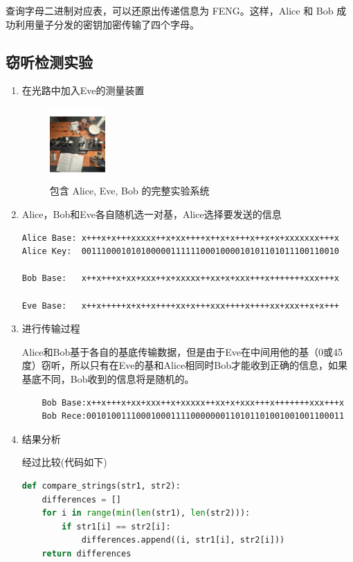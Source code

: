 \documentclass{ctexart}
\begin{document}
查询字母二进制对应表，可以还原出传递信息为 FENG。这样，Alice 和 Bob 成功利用量子分发的密钥加密传输了四个字母。

\subsection{窃听检测实验}
\begin{enumerate}
\item 在光路中加入Eve的测量装置
\begin{figure}[htbp]
    \centering
    \includegraphics[width=0.2\textwidth,height=0.3\textwidth]{pictures/微信图片_20241031162855.jpg}
    \caption{包含 Alice, Eve, Bob 的完整实验系统}
\end{figure}
\item Alice，Bob和Eve各自随机选一对基，Alice选择要发送的信息
\begin{lstlisting}
Alice Base: x+++x+x+++xxxxx++x+xx++++x++x+x+++x++x+x+xxxxxxx+++x
Alice Key:  0011100010101000001111110001000010101101011100110010

Bob Base:   x++x+++x+xx+xxx++x+xxxxx++xx+x+xxx+++x+++++++xxx+++x

Eve Base:   x++x+++++x+x++x++++xx+x+++xxx++++x++++xx+xxx++x+x+++
\end{lstlisting}


\item 进行传输过程

Alice和Bob基于各自的基底传输数据，但是由于Eve在中间用他的基（0或45度）窃听，所以只有在Eve的基和Alice相同时Bob才能收到正确的信息，如果基底不同，Bob收到的信息将是随机的。

\begin{lstlisting}
    Bob Base:x++x+++x+xx+xxx++x+xxxxx++xx+x+xxx+++x+++++++xxx+++x
    Bob Rece:0010100111000100011110000000110101101001001001100011
\end{lstlisting}
\item 结果分析

经过比较(代码如下)
\begin{lstlisting}[language=python]
def compare_strings(str1, str2):
    differences = []
    for i in range(min(len(str1), len(str2))):
        if str1[i] == str2[i]:
            differences.append((i, str1[i], str2[i]))
    return differences


\end{lstlisting}
\end{enumerate}
\end{document}
